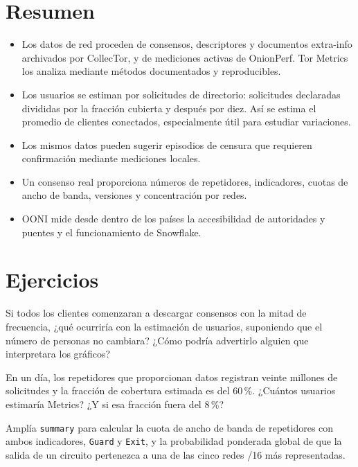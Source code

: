 \section*{Resumen}
\begin{itemize}
  \item Los datos de red proceden de consensos, descriptores y documentos extra-info archivados por CollecTor, y de mediciones activas de OnionPerf. Tor Metrics los analiza mediante métodos documentados y reproducibles.
  \item Los usuarios se estiman por solicitudes de directorio: solicitudes declaradas divididas por la fracción cubierta y después por diez. Así se estima el promedio de clientes conectados, especialmente útil para estudiar variaciones.
  \item Los mismos datos pueden sugerir episodios de censura que requieren confirmación mediante mediciones locales.
  \item Un consenso real proporciona números de repetidores, indicadores, cuotas de ancho de banda, versiones y concentración por redes.
  \item OONI mide desde dentro de los países la accesibilidad de autoridades y puentes y el funcionamiento de Snowflake.
\end{itemize}

\section*{Ejercicios}

\begin{esercizio}[1]\label{es:24-dieci}
Si todos los clientes comenzaran a descargar consensos con la mitad de frecuencia, ¿qué ocurriría con la estimación de usuarios, suponiendo que el número de personas no cambiara? ¿Cómo podría advertirlo alguien que interpretara los gráficos?
\end{esercizio}

\begin{esercizio}[1]\label{es:24-frazione}
En un día, los repetidores que proporcionan datos registran veinte millones de solicitudes y la fracción de cobertura estimada es del 60\,\%. ¿Cuántos usuarios estimaría Metrics? ¿Y si esa fracción fuera del 8\,\%?
\end{esercizio}

\begin{esercizio}[2]\label{es:24-flag}
Amplía \texttt{summary} para calcular la cuota de ancho de banda de repetidores con ambos indicadores, \texttt{Guard} y \texttt{Exit}, y la probabilidad ponderada global de que la salida de un circuito pertenezca a una de las cinco redes /16 más representadas.
\end{esercizio}

